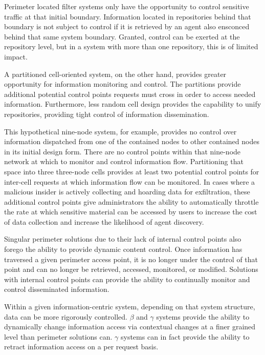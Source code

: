 Perimeter located filter systems only have the opportunity to control sensitive traffic at that initial boundary.  Information located in repositories behind that boundary is not subject to control if it is retrieved by an agent also ensconced behind that same system boundary.  Granted, control can be exerted at the repository level, but in a system with more than one repository, this is of limited impact.

A partitioned cell-oriented system, on the other hand, provides greater opportunity for information monitoring and control.  The partitions provide additional potential control points requests must cross in order to access needed information.  Furthermore, less random cell design provides the capability to unify repositories, providing tight control of information dissemination.

This hypothetical nine-node system, for example, provides no control over information dispatched from one of the contained nodes to other contained nodes in its initial design form.  There are no control points within that nine-node network at which to monitor and control information flow.  Partitioning that space into three three-node cells provides at least two potential control points for inter-cell requests at which information flow can be monitored.  In cases where a malicious insider is actively collecting and hoarding data for exfiltration, these additional control points give administrators the ability to automatically throttle the rate at which sensitive material can be accessed by users to increase the cost of data collection and increase the likelihood of agent discovery.

Singular perimeter solutions due to their lack of internal control points also forego the ability to provide dynamic content control.  Once information has traversed a given perimeter access point, it is no longer under the control of that point and can no longer be retrieved, accessed, monitored, or modified.  Solutions with internal control points can provide the ability to continually monitor and control disseminated information.

Within a given information-centric system, depending on that system structure, data can be more rigorously controlled.  $\beta$ and $\gamma$ systems provide the ability to dynamically change information access via contextual changes at a finer grained level than perimeter solutions can.  $\gamma$ systems can in fact provide the ability to retract information access on a per request basis.

